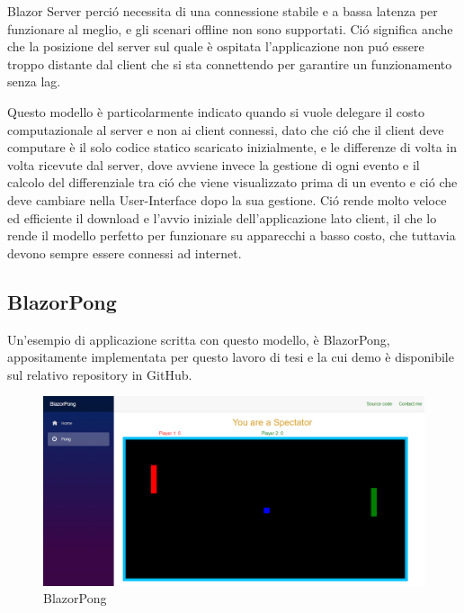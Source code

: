 Blazor Server perci\'o necessita di una connessione stabile e a bassa latenza per funzionare al meglio, e gli scenari offline non sono supportati.
Ci\'o significa anche che la posizione del server sul quale \`e ospitata l'applicazione non pu\'o essere troppo distante dal client che si sta connettendo per garantire un funzionamento senza lag.

Questo modello \`e particolarmente indicato quando si vuole delegare il costo computazionale al server e non ai client connessi, dato che ci\'o che il client deve computare \`e il solo codice statico scaricato inizialmente, e le differenze di volta in volta ricevute dal server, dove avviene invece la gestione di ogni evento e il calcolo del differenziale tra ci\'o che viene visualizzato prima di un evento e ci\'o che deve cambiare nella User-Interface dopo la sua gestione.
Ci\'o rende molto veloce ed efficiente il download e l'avvio iniziale dell'applicazione lato client, il che lo rende il modello perfetto per funzionare su apparecchi a basso costo, che tuttavia devono sempre essere connessi ad internet.

\subsection{BlazorPong }\label{sez:bpong}
Un'esempio di applicazione scritta con questo modello, \`e BlazorPong, appositamente implementata per questo lavoro di tesi e la cui demo \`e disponibile sul relativo repository in GitHub\cite{blazorPong}.

\begin{figure}[H]
	\centerline{\includegraphics[scale=0.3]{figure/BlazorPong.PNG}}
	\caption{BlazorPong}
	\label{fig:BlazorPong}
\end{figure}

